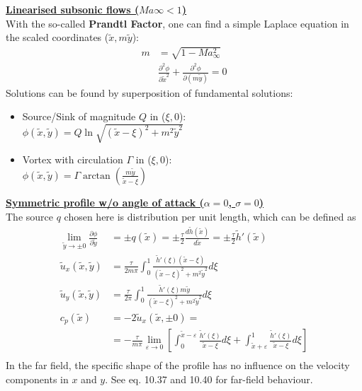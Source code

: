 \documentclass[8pt, landscape, fleqn]{scrartcl}
\begin{document}
\begin{multicols*}{3}
\underline{\textbf{Linearised subsonic flows ($Ma\infty < 1$)}} \\
With the so-called \textbf{Prandtl Factor}, one can find a simple Laplace equation in the scaled coordinates ($\tilde{x},m\tilde{y}$):
\begin{align*}
    m &= \sqrt{1-Ma_\infty^2} \\
&\frac{\partial^2 \phi}{\partial \tilde{x}^2} + \frac{\partial^2 \phi}{\partial(m \tilde{y})} = 0
\end{align*}
Solutions can be found by superposition of fundamental solutions:
\begin{itemize}
    \item Source/Sink of magnitude $Q$ in ($\xi,0$): \\ $\phi(\tilde{x},\tilde{y}) = Q \ln \sqrt{(\tilde{x}-\xi)^2 + m^2\tilde{y}^2}$
    \item Vortex with circulation $\Gamma$ in ($\xi,0$): \\ $\phi(\tilde{x},\tilde{y}) = \Gamma \arctan \left( \frac{m \tilde{y}}{\tilde{x}-\xi} \right)$
\end{itemize}
\underline{\textbf{Symmetric profile w/o angle of attack ($\alpha =0$, $\sigma=0$)}} \\
The source $q$ chosen here is distribution per unit length, which can be defined as 
\begin{align*}
    \lim_{\tilde{y} \rightarrow \pm 0} \frac{\partial \phi}{\partial \tilde{y}} &= \pm q(\tilde{x}) = \pm \frac{\tau}{2}\frac{d \tilde{h}(\tilde{x})}{d \tilde{x}} = \pm \frac{\tau}{2} \tilde{h}'(\tilde{x}) \\
    \tilde{u}_x (\tilde{x},\tilde{y}) &= \frac{\tau}{2 m \pi} \int_0^1 \frac{\tilde{h}'(\xi)(\tilde{x}-\xi)}{(\tilde{x}-\xi)^2 + m^2\tilde{y}^2}d\xi \\
    \tilde{u}_y (\tilde{x},\tilde{y}) &= \frac{\tau}{2 \pi} \int_0^1 \frac{\tilde{h}'(\xi)m \tilde{y}}{(\tilde{x}-\xi)^2 + m^2\tilde{y}^2}d\xi \\
    c_p(\tilde{x}) &= -2 \tilde{u}_x (\tilde{x},\pm 0) = \\
    &= -\frac{\tau}{m\pi} \lim_{\varepsilon \rightarrow 0} \left[ \int_0^{\tilde{x}-\varepsilon} \frac{\tilde{h}'(\xi)}{\tilde{x}-\xi} d\xi + \int_{\tilde{x}+\varepsilon}^{1} \frac{\tilde{h}'(\xi)}{\tilde{x}-\xi} d\xi \right] \\
\end{align*} In the far field, the specific shape of the profile has no influence on the velocity components in $x$ and $y$. See eq. 10.37 and 10.40 for far-field behaviour.\\


\end{multicols*}
\end{document}
